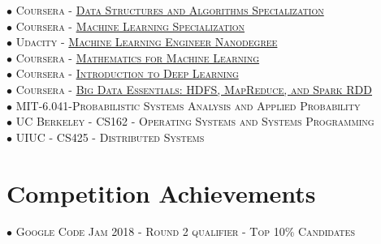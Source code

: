 \documentclass[10pt]{article}
\begin{document}
        $\bullet$ \textsc{Coursera - \href{https://www.coursera.org/account/accomplishments/specialization/certificate/AKFYZQ9QD8XH}{Data Structures and Algorithms Specialization}} \\
        $\bullet$ \textsc{Coursera - \href{https://www.coursera.org/account/accomplishments/specialization/certificate/ZUGAFYKCMQ79}{Machine Learning Specialization}} \\
        $\bullet$ \textsc{Udacity - \href{https://graduation.udacity.com/confirm/HK9JLR3N}{Machine Learning Engineer Nanodegree}} \\
        $\bullet$ \textsc{Coursera - \href{https://www.coursera.org/account/accomplishments/specialization/certificate/N3D6C3DT8QAY?utm_medium=certificate&utm_source=link&utm_campaign=copybutton_certificate}{Mathematics for Machine Learning}} \\
        $\bullet$ \textsc{Coursera - \href{https://www.coursera.org/account/accomplishments/certificate/XN2B7T4AJX8C}{Introduction to Deep Learning}} \\
        $\bullet$ \textsc{Coursera - \href{https://www.coursera.org/account/accomplishments/certificate/G25TQPPNXGW5}{Big Data Essentials: HDFS, MapReduce, and Spark RDD}} \\
        $\bullet$ \textsc{MIT-6.041-Probabilistic Systems Analysis and Applied Probability} \\
        $\bullet$ \textsc{UC Berkeley - CS162 - Operating Systems and Systems Programming} \\
        $\bullet$ \textsc{UIUC - CS425 - Distributed Systems}

    \section{Competition Achievements}
        $\bullet$ \textsc{Google Code Jam 2018 - Round 2 qualifier - Top 10\% Candidates}
\end{document}
